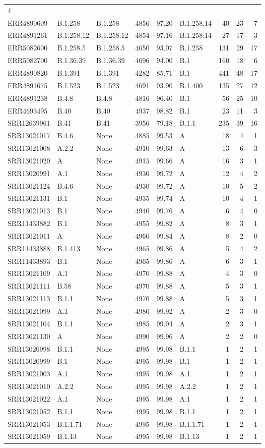 \documentclass[
]{article}
\begin{document}
\begin{longtable}[]{@{}lllrrlrrr@{}}
4\tabularnewline
ERR4890609 & B.1.258 & B.1.258 & 4856 & 97.20 & B.1.258.14 & 40 & 23 &
7\tabularnewline
ERR4891261 & B.1.258.12 & B.1.258.12 & 4854 & 97.16 & B.1.258.14 & 27 &
17 & 3\tabularnewline
ERR5082600 & B.1.258.5 & B.1.258.5 & 4650 & 93.07 & B.1.258 & 131 & 29 &
17\tabularnewline
ERR5082700 & B.1.36.39 & B.1.36.39 & 4696 & 94.00 & B.1 & 160 & 18 &
6\tabularnewline
ERR4890820 & B.1.391 & B.1.391 & 4282 & 85.71 & B.1 & 441 & 48 &
17\tabularnewline
ERR4891675 & B.1.523 & B.1.523 & 4691 & 93.90 & B.1.400 & 135 & 27 &
12\tabularnewline
ERR4891238 & B.4.8 & B.4.8 & 4816 & 96.40 & B.1 & 56 & 25 &
10\tabularnewline
ERR4693495 & B.40 & B.40 & 4937 & 98.82 & B.1 & 23 & 11 &
3\tabularnewline
SRR12639961 & B.41 & B.41 & 3956 & 79.18 & B.1.1 & 235 & 39 &
16\tabularnewline
SRR13021017 & B.4.6 & None & 4885 & 99.53 & A & 18 & 4 &
1\tabularnewline
SRR13021008 & A.2.2 & None & 4910 & 99.63 & A & 13 & 6 &
3\tabularnewline
SRR13021020 & A & None & 4915 & 99.66 & A & 16 & 3 & 1\tabularnewline
SRR13020991 & A.1 & None & 4930 & 99.72 & A & 12 & 4 & 2\tabularnewline
SRR13021124 & B.4.6 & None & 4930 & 99.72 & A & 10 & 5 &
2\tabularnewline
SRR13021131 & B.1 & None & 4935 & 99.74 & A & 10 & 4 & 1\tabularnewline
SRR13021013 & B.1 & None & 4940 & 99.76 & A & 6 & 4 & 0\tabularnewline
SRR11433882 & B.1 & None & 4955 & 99.82 & A & 8 & 3 & 1\tabularnewline
SRR13021011 & A & None & 4960 & 99.84 & A & 8 & 2 & 0\tabularnewline
SRR11433888 & B.1.413 & None & 4965 & 99.86 & A & 5 & 4 &
2\tabularnewline
SRR11433893 & B.1 & None & 4965 & 99.86 & A & 6 & 3 & 1\tabularnewline
SRR13021109 & A.1 & None & 4970 & 99.88 & A & 4 & 3 & 0\tabularnewline
SRR13021111 & B.58 & None & 4970 & 99.88 & A & 5 & 3 & 1\tabularnewline
SRR13021113 & B.1.1 & None & 4970 & 99.88 & A & 5 & 3 & 1\tabularnewline
SRR13021099 & A.1 & None & 4980 & 99.92 & A & 2 & 3 & 0\tabularnewline
SRR13021104 & B.1.1 & None & 4985 & 99.94 & A & 2 & 3 & 1\tabularnewline
SRR13021130 & A & None & 4990 & 99.96 & A & 2 & 2 & 0\tabularnewline
SRR13020998 & B.1.1 & None & 4995 & 99.98 & B.1.1 & 1 & 2 &
1\tabularnewline
SRR13020999 & B.1 & None & 4995 & 99.98 & B.1 & 1 & 2 & 1\tabularnewline
SRR13021003 & A.1 & None & 4995 & 99.98 & A.1 & 1 & 2 & 1\tabularnewline
SRR13021010 & A.2.2 & None & 4995 & 99.98 & A.2.2 & 1 & 2 &
1\tabularnewline
SRR13021022 & A.1 & None & 4995 & 99.98 & A.1 & 1 & 2 & 1\tabularnewline
SRR13021052 & B.1.1 & None & 4995 & 99.98 & B.1.1 & 1 & 2 &
1\tabularnewline
SRR13021053 & B.1.1.71 & None & 4995 & 99.98 & B.1.1.71 & 1 & 2 &
1\tabularnewline
SRR13021059 & B.1.13 & None & 4995 & 99.98 & B.1.13 & 1 & 2 &
1\tabularnewline

\end{longtable}
\end{document}
